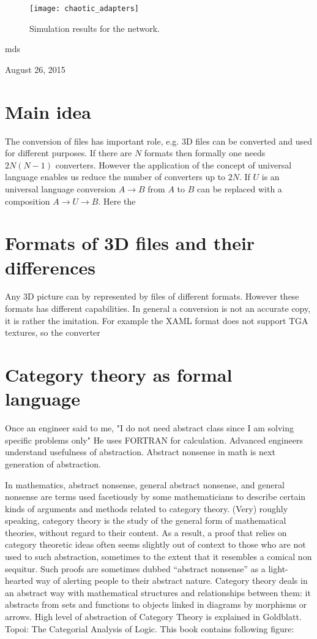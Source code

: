 \documentclass[10pt,journal,compsoc]{IEEEtran}
\begin{document}
	\begin{figure}[!t]
\centering
\texttt{[image: chaotic\_adapters]}
\caption{Simulation results for the network.}
\label{fig_sim}
\end{figure}
	\hfill mds
	
	\hfill August 26, 2015
	
		\section{Main idea}
	The conversion of files has important role, e.g. 3D files can be converted and used for different purposes. If there are $N$ formats then formally one needs $2N\left( N-1\right) $ converters. However the application of the concept of universal language enables us reduce the number of converters up to $2N$. If $U$ is an universal language  conversion $A \to B$ from $A$ to $B$ can be replaced with a  composition $A \to U \to B$. Here the 
	
	\section{Formats of 3D files and their differences}
	Any 3D picture can by represented by files of different formats. However these formats has different capabilities. In general a conversion is not an accurate copy, it is rather the imitation. For example the XAML format does not support TGA textures, so the converter 
	
	\section{Category theory as formal language}
	
	Once an engineer said to me, "I do not need abstract class since I am solving specific problems only" He uses FORTRAN for calculation. Advanced engineers understand usefulness of abstraction. Abstract nonsense in math is next generation of abstraction.
	
	In mathematics, abstract nonsense, general abstract nonsense, and general nonsense are terms used facetiously by some mathematicians to describe certain kinds of arguments and methods related to category theory. (Very) roughly speaking, category theory is the study of the general form of mathematical theories, without regard to their content. As a result, a proof that relies on category theoretic ideas often seems slightly out of context to those who are not used to such abstraction, sometimes to the extent that it resembles a comical non sequitur. Such proofs are sometimes dubbed “abstract nonsense” as a light-hearted way of alerting people to their abstract nature. Category theory deals in an abstract way with mathematical structures and relationships between them: it abstracts from sets and functions to objects linked in diagrams by morphisms or arrows. High level of abstraction of Category Theory is explained in Goldblatt. Topoi: The Categorial Analysis of Logic. This book contains following figure:
	
\end{document}
